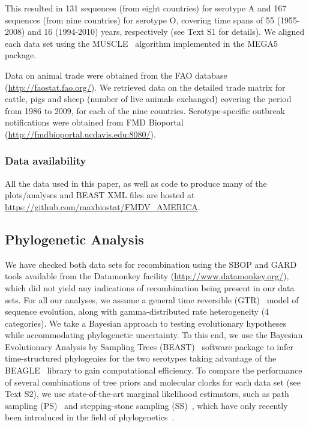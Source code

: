 \documentclass[10pt]{article}
\begin{document}
This resulted in 131 sequences (from eight countries) for serotype A and 167 sequences (from nine countries) for serotype O, covering time spans of 55 (1955-2008) and 16 (1994-2010) years, respectively (see Text S1 for details).
We aligned each data set using the MUSCLE~\cite{Edgar2004} algorithm implemented in the MEGA5~\cite{Tamura2011} package.

Data on animal trade were obtained from the FAO database (\url{http://faostat.fao.org/}).
We retrieved data on the detailed trade matrix for cattle, pigs and sheep (number of live animals exchanged) covering the period from 1986 to 2009, for each of the nine countries.
Serotype-specific outbreak notifications were obtained from FMD Bioportal (\url{http://fmdbioportal.ucdavis.edu:8080/}).

\subsubsection*{Data availability}
All the data used in this paper, as well as code to produce many of the plots/analyses and BEAST XML files are hosted at \url{https://github.com/maxbiostat/FMDV_AMERICA}.

\subsection*{Phylogenetic Analysis}

We have checked both data sets for recombination using the SBOP and GARD~\cite{Kosakovsky2006} tools available from the Datamonkey facility (\url{http://www.datamonkey.org/}), which did not yield any indications of recombination being present in our data sets.
For all our analyses, we assume a general time reversible (GTR)~\cite{Tavare1986} model of sequence evolution, along with gamma-distributed rate heterogeneity (4 categories).
We take a Bayesian approach to testing evolutionary hypotheses while accommodating phylogenetic uncertainty. 
To this end, we use the Bayesian Evolutionary Analysis by Sampling Trees (BEAST)~\cite{Drummond2012} software package to infer time-structured phylogenies for the two serotypes taking advantage of the BEAGLE~\cite{Ayres2012} library to gain computational efficiency.
To compare the performance of several combinations of tree priors and molecular clocks for each data set (see Text S2), we use state-of-the-art marginal likelihood estimators, such as path sampling (PS)~\cite{Lartillot2006} and stepping-stone sampling (SS)~\cite{Xie2011}, which have only recently been introduced in the field of phylogenetics~\cite{Lartillot2006, Xie2011, Baele2012, Baele2013a, Baele2013b, Baele2013c}.
\end{document}
